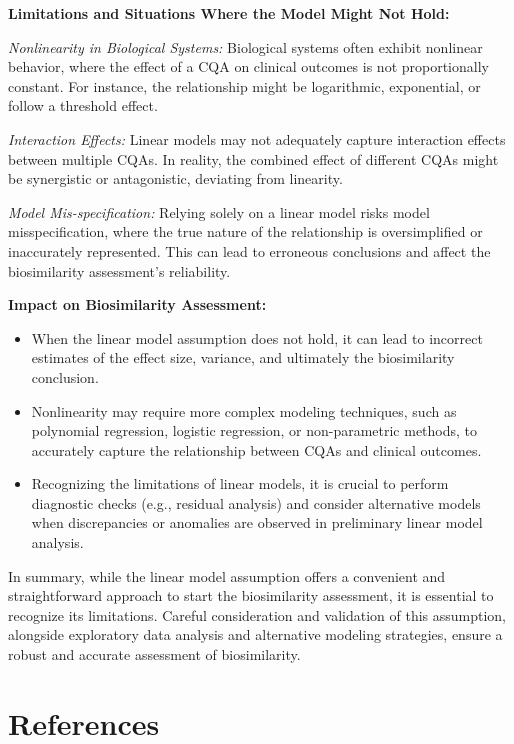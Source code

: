 \documentclass[
  12pt,
  a4paper,
]{article}
\providecommand{\tightlist}{%
  \setlength{\itemsep}{0pt}\setlength{\parskip}{0pt}}
\numberwithin{equation}{section}
\theoremstyle{plain}
\theoremstyle{definition}
\theoremstyle{remark}
\theoremstyle{note}
\begin{document}
\textbf{Limitations and Situations Where the Model Might Not Hold:}

\emph{Nonlinearity in Biological Systems:} Biological systems often
exhibit nonlinear behavior, where the effect of a CQA on clinical
outcomes is not proportionally constant. For instance, the relationship
might be logarithmic, exponential, or follow a threshold effect.

\emph{Interaction Effects:} Linear models may not adequately capture
interaction effects between multiple CQAs. In reality, the combined
effect of different CQAs might be synergistic or antagonistic, deviating
from linearity.

\emph{Model Mis-specification:} Relying solely on a linear model risks
model misspecification, where the true nature of the relationship is
oversimplified or inaccurately represented. This can lead to erroneous
conclusions and affect the biosimilarity assessment's reliability.

\textbf{Impact on Biosimilarity Assessment:}

\begin{itemize}
\tightlist
\item
  When the linear model assumption does not hold, it can lead to
  incorrect estimates of the effect size, variance, and ultimately the
  biosimilarity conclusion.
\item
  Nonlinearity may require more complex modeling techniques, such as
  polynomial regression, logistic regression, or non-parametric methods,
  to accurately capture the relationship between CQAs and clinical
  outcomes.
\item
  Recognizing the limitations of linear models, it is crucial to perform
  diagnostic checks (e.g., residual analysis) and consider alternative
  models when discrepancies or anomalies are observed in preliminary
  linear model analysis.
\end{itemize}

In summary, while the linear model assumption offers a convenient and
straightforward approach to start the biosimilarity assessment, it is
essential to recognize its limitations. Careful consideration and
validation of this assumption, alongside exploratory data analysis and
alternative modeling strategies, ensure a robust and accurate assessment
of biosimilarity.

\newpage

\hypertarget{references}{%
\section*{References}\label{references}}
\end{document}
